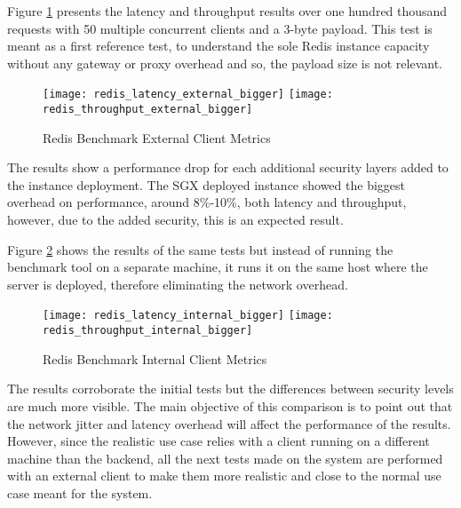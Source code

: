 Figure \ref{fig:redis_benchmark_external_metrics} presents the latency and throughput results over one hundred thousand requests with 50 multiple concurrent clients and a 3-byte payload. This test is meant as a first reference test, to understand the sole Redis instance capacity without any gateway or proxy overhead and so, the payload size is not relevant.

\begin{figure}[htbp]
  \centering
    {\texttt{[image: redis\_latency\_external\_bigger]}}%
    {\texttt{[image: redis\_throughput\_external\_bigger]}}%
  \caption{Redis Benchmark External Client Metrics}
  \label{fig:redis_benchmark_external_metrics}
\end{figure}

The results show a performance drop for each additional security layers added to the instance deployment. The \gls{SGX} deployed instance showed the biggest overhead on performance, around 8\%-10\%, both latency and throughput, however, due to the added security, this is an expected result.

Figure \ref{fig:redis_benchmark_internal_metrics} shows the results of the same tests but instead of running the benchmark tool on a separate machine, it runs it on the same host where the server is deployed, therefore eliminating the network overhead.

\begin{figure}[htbp]
  \centering
    {\texttt{[image: redis\_latency\_internal\_bigger]}}%
    {\texttt{[image: redis\_throughput\_internal\_bigger]}}%
  \caption{Redis Benchmark Internal Client Metrics}
  \label{fig:redis_benchmark_internal_metrics}
\end{figure}

The results corroborate the initial tests but the differences between security levels are much more visible. The main objective of this comparison is to point out that the network jitter and latency overhead will affect the performance of the results. However, since the realistic use case relies with a client running on a different machine than the backend, all the next tests made on the system are performed with an external client to make them more realistic and close to the normal use case meant for the system.

